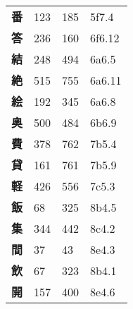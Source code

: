 \begin{longtable}[c]{llll}
    \bfseries 番 & 123 & 185 & 5f7.4\\
    \bfseries 答 & 236 & 160 & 6f6.12\\
    \bfseries 結 & 248 & 494 & 6a6.5\\
    \bfseries 絶 & 515 & 755 & 6a6.11\\
    \bfseries 絵 & 192 & 345 & 6a6.8\\
    \bfseries 奥 & 500 & 484 & 6b6.9\\
    \bfseries 費 & 378 & 762 & 7b5.4\\
    \bfseries 貸 & 161 & 761 & 7b5.9\\
    \bfseries 軽 & 426 & 556 & 7c5.3\\
    \bfseries 飯 & 68 & 325 & 8b4.5\\
    \bfseries 集 & 344 & 442 & 8c4.2\\
    \bfseries 間 & 37 & 43 & 8e4.3\\
    \bfseries 飲 & 67 & 323 & 8b4.1\\
    \bfseries 開 & 157 & 400 & 8e4.6\\
  \end{longtable}
